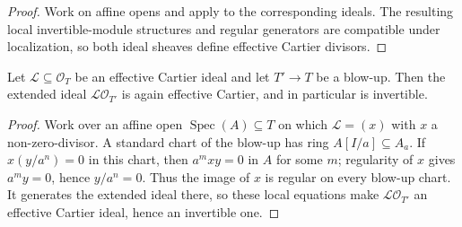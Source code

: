 \begin{proof}
  Work on affine opens and apply
   to the corresponding
  ideals.  The resulting local invertible-module structures and regular
  generators are compatible under localization, so both ideal sheaves define
  effective Cartier divisors.
\end{proof}

\begin{lemma}
  \label{lemma:nagata-cartier-total-transform-blowup}

  Let $\mathcal L\subseteq\mathcal O_T$ be an effective Cartier ideal and let
  $T'\to T$ be a blow-up.  Then the extended ideal
  $\mathcal L\mathcal O_{T'}$ is again effective Cartier, and in particular
  is invertible.
\end{lemma}

\begin{proof}
  Work over an affine open $\operatorname{Spec}(A)\subseteq T$ on which
  $\mathcal L=(x)$ with $x$ a non-zero-divisor.  A standard chart of the
  blow-up has ring $A[I/a]\subseteq A_a$.  If
  $x(y/a^n)=0$ in this chart, then $a^mxy=0$ in $A$ for some $m$; regularity
  of $x$ gives $a^my=0$, hence $y/a^n=0$.  Thus the image of $x$ is regular
  on every blow-up chart.  It generates the extended ideal there, so these
  local equations make $\mathcal L\mathcal O_{T'}$ an effective Cartier
  ideal, hence an invertible one.
\end{proof}

